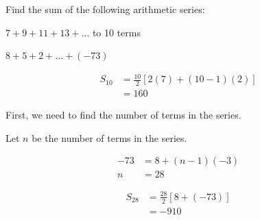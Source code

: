 \documentclass[11pt,a4paper]{book}
\begin{document}
\begin{example}

Find the sum of the following arithmetic series:

\begin{tasks}[label=(\alph*),label-width=3.5ex] 

\task  $7+9+11+13+\ldots$ to 10 terms

\task  $8+5+2+\ldots+\left(-73\right)$

\end{tasks} 

\Solution

\begin{tasks}[label=(\alph*),label-width=3.5ex] 

\task  
\begin{align*}
S_{10} & =\frac{10}{2}\left[2\left(7\right)+\left(10-1\right)\left(2\right)\right]\\
 & =160
\end{align*}

\task  First, we need to find the number of terms in the series. 

Let $n$ be the number of terms in the series.

\begin{align*}
-73 & =8+\left(n-1\right)\left(-3\right)\\
n & =28
\end{align*}

\begin{align*}
S_{28} & =\frac{28}{2}\left[8+\left(-73\right)\right]\\
 & =-910
\end{align*}

\end{tasks} 

\end{example}
\end{document}
